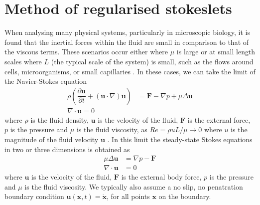 \FloatBarrier
\section{Method of regularised stokeslets} \label{sec:MRS}

When analysing many physical systems, particularly in microscopic biology, it is found that the inertial forces within the fluid are small in comparison to that of the viscous terms. These scenarios occur either where $\mu$ is large or at small length scales where $L$ (the typical scale of the system) is small, such as the flows around cells, microorganisms, or small capillaries \cite{Blake1972AOrganisms, Higdon1979APropulsion, Smith2009MathematicalFluids}.
In these cases, we can take the limit of the Navier-Stokes equation 
\begin{equation}
\label{eq:NavierStokes}
\begin{aligned}
    \rho \left(\dfrac{\partial \mathbf{u}}{\partial t}+(\mathbf{u} \cdot \nabla) \mathbf{u}\right) &= \mathbf{F}-\nabla p+\mu  \Delta \mathbf{u}\\
    \nabla\cdot\mathbf{u} = 0
\end{aligned}
\end{equation}
where $\rho$ is the fluid density, $\mathbf{u}$ is the velocity of the fluid, $\mathbf{F}$ is the external force, $p$ is the pressure and $\mu$ is the fluid viscosity, as $Re=\rho u L/\mu \to 0 $ where $u$ is the magnitude of the fluid velocity $\mathbf{u}$ \cite{Trombley2019BasicFlows}.
In this limit the steady-state Stokes equations in two or three dimensions is obtained as 
\begin{subequations}
\label{eq:StokesFlow}
\begin{align}
    \mu\Delta\boldsymbol{u} &= \nabla p - \boldsymbol{F} \label{eq:StokesFlow1} \\
    \nabla \cdot \boldsymbol{u} &= 0 \label{eq:StokesFlow2}
\end{align}
\end{subequations}
where $\bm{u}$ is the velocity of the fluid, $\bm{F}$ is the external body force, $p$ is the pressure and $\mu$ is the fluid viscosity. We typically also assume a no slip, no penatration boundary condition $\bm{u}(\bm{x},t)=\dot{\bm{x}}$, for all points $\bm{x}$ on the boundary. 

